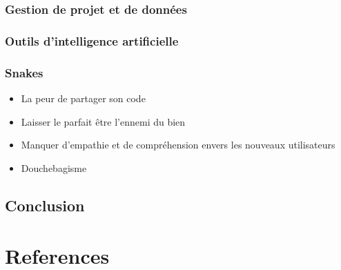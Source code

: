 \documentclass[
  letterpaper,
]{scrbook}
\begin{document}
\hypertarget{gestion-de-projet-et-de-donnuxe9es}{%
\subsection{Gestion de projet et de
données}\label{gestion-de-projet-et-de-donnuxe9es}}

\hypertarget{outils-dintelligence-artificielle-1}{%
\subsection{Outils d'intelligence
artificielle}\label{outils-dintelligence-artificielle-1}}

\hypertarget{snakes}{%
\subsection{Snakes}\label{snakes}}

\begin{itemize}
\item
  La peur de partager son code
\item
  Laisser le parfait être l'ennemi du bien
\item
  Manquer d'empathie et de compréhension envers les nouveaux
  utilisateurs
\item
  Douchebagisme
\end{itemize}

\hypertarget{conclusion}{%
\section{Conclusion}\label{conclusion}}


\hypertarget{references}{%
\chapter*{References}\label{references}}

\end{document}
